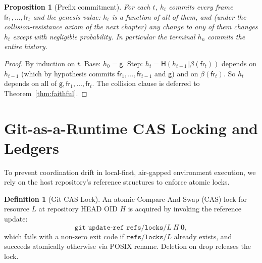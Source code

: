 \documentclass[11pt,oneside]{book}
\theoremstyle{definition}
\newtheorem{definition}{Definition}[chapter]
\theoremstyle{plain}
\newtheorem{proposition}[theorem]{Proposition}
\theoremstyle{remark}
\newcommand{\chainH}{\mathsf{H}}               %
\newcommand{\fr}{\mathsf{fr}}                   %
\newcommand{\body}{\beta}                       %
\newcommand{\code}[1]{\texttt{#1}}
\newcommand{\concat}{\mathbin{\Vert}}           %
\newcommand{\Genesis}{\mathsf{g}}               %
\begin{document}
\begin{proposition}[Prefix commitment]\label{prop:prefix}
For each $t$, $h_t$ commits every frame $\fr_1,\dots,\fr_t$ and the genesis value: $h_t$ is a function of all of them, and (under the collision-resistance axiom of the next chapter) any change to any of them changes $h_t$ except with negligible probability. %
In particular the terminal $h_n$ commits the entire history. %
\end{proposition}

\begin{proof}
By induction on $t$. %
Base: $h_0=\Genesis$. %
Step: $h_t=\chainH(h_{t-1}\concat\body(\fr_t))$ depends on $h_{t-1}$ (which by hypothesis commits $\fr_1,\dots,\fr_{t-1}$ and $\Genesis$) and on $\body(\fr_t)$. %
So $h_t$ depends on all of $\Genesis,\fr_1,\dots,\fr_t$. %
The collision clause is deferred to Theorem~\ref{thm:faithful}. %
\end{proof} %

\section{Git-as-a-Runtime CAS Locking and Ledgers}

To prevent coordination drift in local-first, air-gapped environment execution, we rely on the host repository's reference structures to enforce atomic locks. %

\begin{definition}[Git CAS Lock]\label{def:gitlock}
An atomic Compare-And-Swap (CAS) lock for resource $L$ at repository HEAD OID $H$ is acquired by invoking the reference update: %
\begin{equation}\label{eq:gitlock}
\code{git update-ref refs/locks/}L\ H\ \bm 0,
\end{equation}
which fails with a non-zero exit code if $\code{refs/locks/}L$ already exists, and succeeds atomically otherwise via POSIX rename. %
Deletion on drop releases the lock. %
\end{definition}
\end{document}
